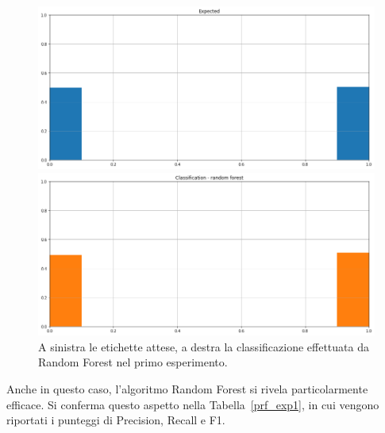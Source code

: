 \documentclass[12pt]{report}
\theoremstyle{definition}
\begin{document}
\begin{figure}
\centering
    \begin{minipage}{0.48\textwidth}
        \includegraphics[width=\linewidth]{images/experiment_uniform_disgiunti/expected_classification.png}
    \end{minipage}
    \begin{minipage}{0.48\textwidth}
        \includegraphics[width=\linewidth]{images/experiment_uniform_disgiunti/prediction_classification_rf.png}
    \end{minipage}
    \caption{A sinistra le etichette attese, a destra la classificazione effettuata da Random Forest nel primo esperimento.}
    \label{rf_class_exp1}
\end{figure} 
Anche in questo caso, l'algoritmo Random Forest si rivela particolarmente efficace. Si conferma questo aspetto nella Tabella~\ref{prf_exp1}, in cui vengono riportati i punteggi di Precision, Recall e F1.
\end{document}
